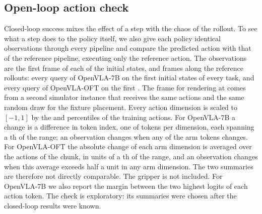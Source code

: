 \subsection{Open-loop action check}
\label{sec:olmethod}

Closed-loop success mixes the effect of a step with the chaos of the rollout. To see what a step does to the policy itself, we also give each policy identical observations through every pipeline and compare the predicted action with that of the reference pipeline, executing only the reference action. The observations are the first frame of each of the \NPairs{} initial states, and frames along the reference rollouts: every \OlStride{} query of OpenVLA-7B on the first \OlSevStates{} initial states of every task, and every query of OpenVLA-OFT on the first \OlOftStates. The frame for rendering at \InputRes{} comes from a second simulator instance that receives the same actions and the same random draw for the fixture placement. Every action dimension is scaled to $[-1, 1]$ by the \PctLo{} and \PctHi{} percentiles of the training actions. For OpenVLA-7B a change is a difference in token index, one of \Bins{} tokens per dimension, each spanning a \TokenSpan{}th of the range; an observation changes when any of the \SevTokenDims{} arm tokens changes. For OpenVLA-OFT the absolute change of each arm dimension is averaged over the \Chunk{} actions of the chunk, in units of a \Bins{}th of the range, and an observation changes when this average exceeds half a unit in any arm dimension. The two summaries are therefore not directly comparable. The gripper is not included. For OpenVLA-7B we also report the margin between the two highest logits of each action token. The check is exploratory: its summaries were chosen after the closed-loop results were known.
